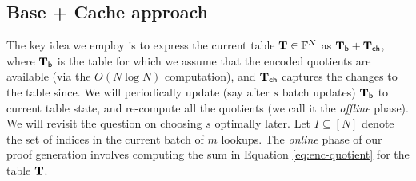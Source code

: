 \subsection{Base + Cache approach}\label{subsec:base-cache}
The key idea we employ is to express the current table $\mathbf{T}\in \mathbb{F}^N$ as $\mathbf{T}_{\mathsf{b}} + \mathbf{T}_{\mathsf{ch}}$, where $\mathbf{T}_{\mathsf{b}}$ is the table for which we assume that
the encoded quotients are available (via the $O(N\log N)$ computation), and $\mathbf{T}_{\mathsf{ch}}$ captures the changes to the table since. We will periodically update (say
after $s$ batch updates) $\mathbf{T}_{\mathsf{b}}$ to current table state, and re-compute all the quotients (we call it the {\em offline} phase).
We will revisit the question on choosing $s$ optimally later. Let $I\subseteq [N]$ denote the set of indices in the current batch of $m$ lookups. The {\em online}
phase of our proof generation involves computing the sum in Equation \eqref{eq:enc-quotient} for the table $\mathbf{T}$.
